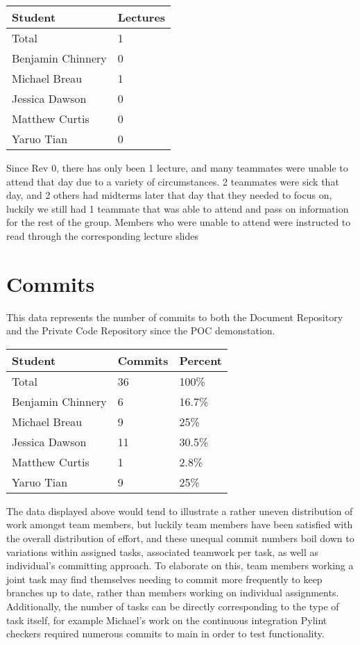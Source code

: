 \documentclass{article}
\begin{document}
\begin{table}[H]
\centering
\begin{tabular}{ll}
\toprule
\textbf{Student} & \textbf{Lectures}\\
\midrule
Total & 1\\
Benjamin Chinnery & 0\\
Michael Breau & 1\\
Jessica Dawson & 0\\
Matthew Curtis & 0\\
Yaruo Tian & 0\\
\bottomrule
\end{tabular}
\end{table}

Since Rev 0, there has only been 1 lecture, and many teammates were unable to attend that day due to a variety of circumstances. 2 teammates were sick that day, and 2 others had midterms later that day that they needed to focus on, luckily we still had 1 teammate that was able to attend and pass on information for the rest of the group. Members who were unable to attend were instructed to read through the corresponding lecture slides 

\section{Commits}

This data represents the number of commits to both the Document Repository and the Private Code Repository since the POC demonstation. 
\begin{table}[H]
\centering
\begin{tabular}{lll}
\toprule
\textbf{Student} & \textbf{Commits} & \textbf{Percent}\\
\midrule
Total & 36 & 100\% \\
Benjamin Chinnery & 6 & 16.7\%\\
Michael Breau & 9 & 25\%\\
Jessica Dawson & 11 & 30.5\%\\
Matthew Curtis & 1 & 2.8\%\\
Yaruo Tian & 9 & 25\%\\
\bottomrule
\end{tabular}
\end{table}

The data displayed above would tend to illustrate a rather uneven distribution of work amongst team members, but luckily team members have been satisfied with the overall distribution of effort, and these unequal commit numbers boil down to variations within assigned tasks, associated teamwork per task, as well as individual's committing approach. To elaborate on this, team members working a joint task may find themselves needing to commit more frequently to keep branches up to date, rather than members working on individual assignments. Additionally, the number of tasks can be directly corresponding to the type of task itself, for example Michael's work on the continuous integration Pylint checkers required numerous commits to main in order to test functionality.
\end{document}
